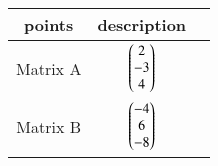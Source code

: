 \begin{tabular}{|c|c|c|}
    \hline
    points & description \\
    \hline
    Matrix A & $\begin{pmatrix}2\\-3\\4\end{pmatrix}$ \\
    \hline
    Matrix B & $\begin{pmatrix}-4\\6\\-8\end{pmatrix}$ \\
    \hline
\end{tabular}
